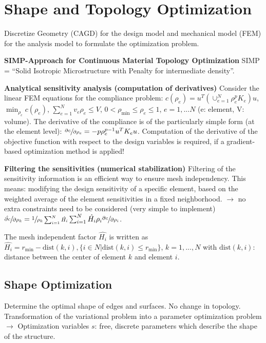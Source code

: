 \section*{Shape and Topology Optimization}
Discretize Geometry (CAGD) for the design model and mechanical model (FEM) for the analysis model to formulate the optimization problem. 

\textbf{SIMP-Approach for Continuous Material Topology Optimization}
SIMP = “Solid Isotropic Microstructure with Penalty for intermediate density”. 

\textbf{Analytical sensitivity analysis (computation of derivatives)}
Consider the linear FEM equations for the compliance problem:
$c(\rho_e) = u^T (\cup_{e=1}^{N}\rho_e^p K_e) u$,
$\min_{\rho_e} c(\rho_e)$, 
$\sum_{e=1}^N v_e \rho_e \leq V$, 
$0 < \rho_{\text{min}}\leq \rho_e \leq 1$, 
$e=1,...N$ (e: element, V: volume).
The derivative of the compliance is of the particularly simple form (at the element level):
$\sfrac{\partial c}{\partial \rho_e} = -p \rho_e^{p-1} u^T K_e u$.
Computation of the derivative of the objective function with respect to the design variables is required, if a gradient-based optimization method is applied!

\textbf{Filtering the sensitivities (numerical stabilization)}
Filtering of the sensitivity information is an efficient way to ensure mesh independency. 
This means: modifying the design sensitivity of a specific element, based on the weighted average of the
element sensitivities in a fixed neighborhood.
$\rightarrow$ no extra constraints need to be considered (very simple to implement)
$\sfrac{\hat{\partial c}}{\partial \rho_k} = \sfrac{1}{\rho_k \sum_{i=1}^N \hat{H_i}} \sum_{i=1}^N \hat{H_i} \rho_i \sfrac{\partial c}{\partial \rho_i}$.

The mesh independent factor $\hat{H_i}$ is written as
$\hat{H_i} = r_{\text{min}} - \text{dist}(k,i), \{i \in N | \text{dist}(k,i) \leq r_{\text{min}}\}$, 
$k = 1,...,N$ with $\text{dist}(k,i)$: distance between the center of element $k$ and element $i$.

\subsection*{Shape Optimization}
Determine the optimal shape of edges and surfaces. No change in topology.
Transformation of the variational problem into a parameter optimization problem
$\rightarrow$ Optimization variables $s$: free, discrete parameters which describe the shape of the structure.

